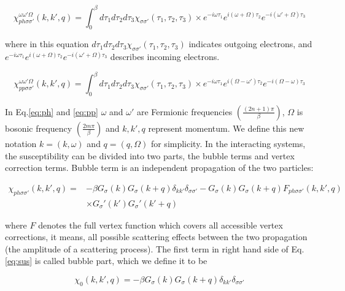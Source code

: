\begin{equation}
    \chi_{ph \sigma \sigma'}^{\omega \omega ' \Omega} (k,k',q)= \int _{0}^\beta d\tau_1 d\tau_2 d\tau_3 \chi _{\sigma \sigma '}(\tau_1, \tau_2, \tau_3) \times e^{-i\omega \tau_1} e^{i(\omega + \Omega)\tau_2} e^{-i(\omega ' + \Omega)\tau_3}
    \label{eq:ph}
\end{equation}

where in this equation $d\tau_1 d\tau_2 d\tau_3 \chi _{\sigma \sigma '}(\tau_1, \tau_2, \tau_3)$  indicates outgoing electrons, and $e^{-i\omega \tau_1} e^{i(\omega + \Omega)\tau_2} e^{-i(\omega ' + \Omega)\tau_3}$ describes incoming electrons.

\begin{equation}
    \chi_{pp \sigma \sigma'}^{\omega \omega ' \Omega} (k,k',q)= \int _{0}^\beta d\tau_1 d\tau_2 d\tau_3 \chi _{\sigma \sigma '}(\tau_1, \tau_2, \tau_3) \times e^{-i\omega \tau_1} e^{i(\Omega - \omega ')\tau_2} e^{-i(\Omega- \omega)\tau_3}
    \label{eq:pp}
\end{equation}
 
In Eq.\ref{eq:ph} and \ref{eq:pp} $\omega$ and $\omega '$ are Fermionic frequencies $(\frac{(2n+1)\pi}{\beta})$, $\Omega$ is bosonic
frequency $(\frac{2m\pi}{\beta})$ and $k,k',q$ represent momentum. We define this new notation $k=(k, \omega)$ and $q=(q, \Omega)$ for simplicity. In the interacting systems, the susceptibility can be divided into two parts, the bubble terms and vertex correction terms. Bubble term is  an independent propagation of the two particles:

\begin{equation}
\begin{split}
    \chi_{ph\sigma \sigma '}(k,k',q)=&-\beta G_\sigma (k)G_\sigma (k+q)\delta_{kk'}\delta_{\sigma \sigma'}-G_\sigma (k)G_\sigma (k+q)F_{ph\sigma \sigma'}(k,k',q)\\
    & \times G_\sigma' (k')G_\sigma' (k'+q)
    \end{split}
    \label{eq:sus}
\end{equation}

where $F$ denotes the full vertex function which covers all accessible vertex corrections, it means, all possible scattering effects between the two propagation (the amplitude of a scattering process). The first term in right hand side of Eq. \ref{eq:sus} is called bubble part, which we define it to be 

\begin{equation}
  \chi_{0}(k,k',q)=  -\beta G_\sigma (k)G_\sigma (k+q)\delta_{kk'}\delta_{\sigma \sigma'}
\end{equation}

